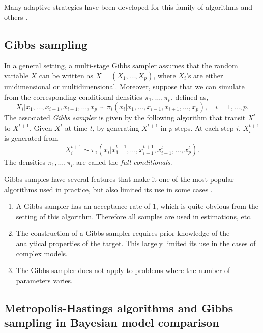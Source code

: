 \documentclass[11pt, hyper, bib, fontset=Minion]{marticle}
\begin{document}
Many adaptive strategies have been developed for this family of algorithms and
others \parencite[see][for a recent review]{Andrieu:2008kh}.

\subsection{Gibbs sampling}
\label{sub:Gibbs sampling}

In a general setting, a multi-stage Gibbs sampler assumes that the random
variable $X$ can be written as $X = (X_1,\dots,X_p)$, where $X_i$'s are either
unidimensional or multidimensional. Moreover, suppose that we can simulate
from the corresponding conditional densities $\pi_1,\dots,\pi_p$, defined as,
\begin{equation}
  X_i|x_1,\dots,x_{i-1},x_{i+1},\dots,x_p
  \sim \pi_i(x_i|x_1,\dots,x_{i-1},x_{i+1},\dots,x_p),\quad i = 1,\dots,p.
\end{equation}
The associated \emph{Gibbs sampler} is given by the following algorithm that
transit $X^t$ to $X^{t+1}$. Given $X^t$ at time $t$, by generating $X^{t+1}$
in $p$ steps. At each step $i$, $X_i^{t+1}$ is generated from
\begin{equation}
  X_i^{t+1} \sim
  \pi_i(x_i|x_1^{t+1},\dots,x_{i-1}^{t+1},x_{i+1}^t,\dots,x_p^t).
\end{equation}
The densities $\pi_1,\dots,\pi_p$ are called the \emph{full conditionals}.

Gibbs samples have several features that make it one of the most popular \mcmc
algorithms used in practice, but also limited its use in some cases
\parencite[see][chap.~10]{Robert:2004tn}.
\begin{enumerate}
  \item A Gibbs sampler has an acceptance rate of $1$, which is quite obvious
    from the setting of this algorithm. Therefore all samples are used in
    estimations, etc.
  \item The construction of a Gibbs sampler requires prior knowledge of the
    analytical properties of the target. This largely limited its use in the
    cases of complex models.
  \item The Gibbs sampler does not apply to problems where the number of
    parameters varies.
\end{enumerate}

\subsection{Metropolis-Hastings algorithms and Gibbs sampling in Bayesian
  model comparison}
\label{sub:Metropolis-Hastings algorithms and Gibbs sampling in Bayesian}
\end{document}
